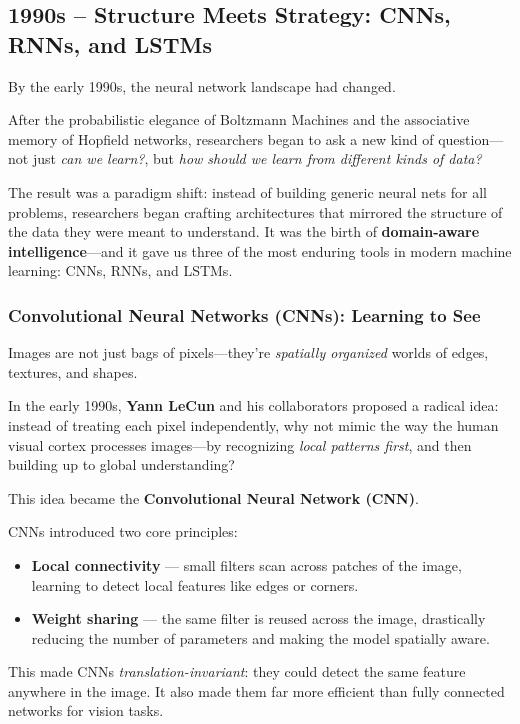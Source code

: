 \subsection{1990s – Structure Meets Strategy: CNNs, RNNs, and LSTMs}

By the early 1990s, the neural network landscape had changed.

After the probabilistic elegance of Boltzmann Machines and the associative memory of Hopfield networks, researchers began to ask a new kind of question—not just \emph{can we learn?}, but \emph{how should we learn from different kinds of data?}

The result was a paradigm shift: instead of building generic neural nets for all problems, researchers began crafting architectures that mirrored the structure of the data they were meant to understand. It was the birth of \textbf{domain-aware intelligence}—and it gave us three of the most enduring tools in modern machine learning: CNNs, RNNs, and LSTMs.

\subsubsection{Convolutional Neural Networks (CNNs): Learning to See}

Images are not just bags of pixels—they're \emph{spatially organized} worlds of edges, textures, and shapes.

In the early 1990s, \textbf{Yann LeCun} and his collaborators proposed a radical idea: instead of treating each pixel independently, why not mimic the way the human visual cortex processes images—by recognizing \emph{local patterns first}, and then building up to global understanding?

This idea became the \textbf{Convolutional Neural Network (CNN)}.

CNNs introduced two core principles:

\begin{itemize}
  \item \textbf{Local connectivity} — small filters scan across patches of the image, learning to detect local features like edges or corners.
  \item \textbf{Weight sharing} — the same filter is reused across the image, drastically reducing the number of parameters and making the model spatially aware.
\end{itemize}

This made CNNs \emph{translation-invariant}: they could detect the same feature anywhere in the image. It also made them far more efficient than fully connected networks for vision tasks.

